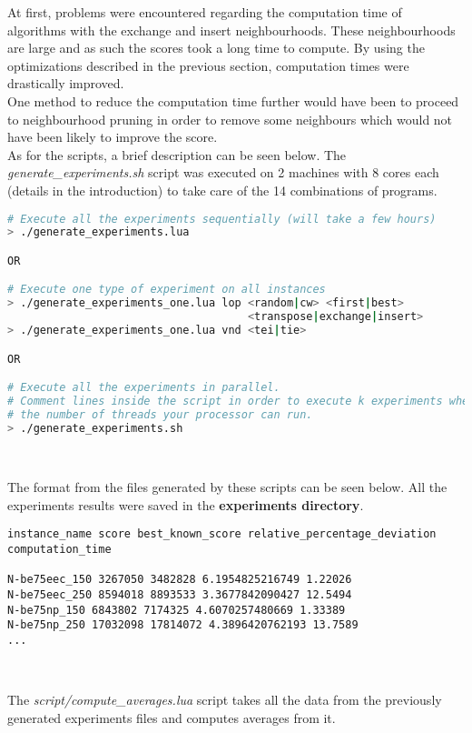 At first, problems were encountered regarding the computation time of algorithms
with the exchange and insert neighbourhoods. These neighbourhoods
are large and as such the scores took a long time to compute. By using the
optimizations described in the previous section, computation times were
drastically improved.\\

One method to reduce the computation time further would have been to proceed to
neighbourhood pruning in order to remove some neighbours which would not have
been likely to improve the score.\\

\noindent As for the scripts, a brief description can be seen below. The
\emph{generate\_experiments.sh} script was executed on 2 machines with 8 cores
each (details in the introduction) to take care of the 14 combinations of
programs.

\begin{lstlisting}[language=bash]
# Execute all the experiments sequentially (will take a few hours)
> ./generate_experiments.lua

OR

# Execute one type of experiment on all instances
> ./generate_experiments_one.lua lop <random|cw> <first|best>
                                     <transpose|exchange|insert>
> ./generate_experiments_one.lua vnd <tei|tie>

OR

# Execute all the experiments in parallel.
# Comment lines inside the script in order to execute k experiments where k is
# the number of threads your processor can run.
> ./generate_experiments.sh
\end{lstlisting}
\

The format from the files generated by these scripts can be seen below. All the
experiments results were saved in the \textbf{experiments directory}.

\begin{lstlisting}
instance_name score best_known_score relative_percentage_deviation computation_time

N-be75eec_150 3267050 3482828 6.1954825216749 1.22026
N-be75eec_250 8594018 8893533 3.3677842090427 12.5494
N-be75np_150 6843802 7174325 4.6070257480669 1.33389
N-be75np_250 17032098 17814072 4.3896420762193 13.7589
...
\end{lstlisting}
\

The \emph{script/compute\_averages.lua} script takes all the data from the
previously generated experiments files and computes averages from it.\\

